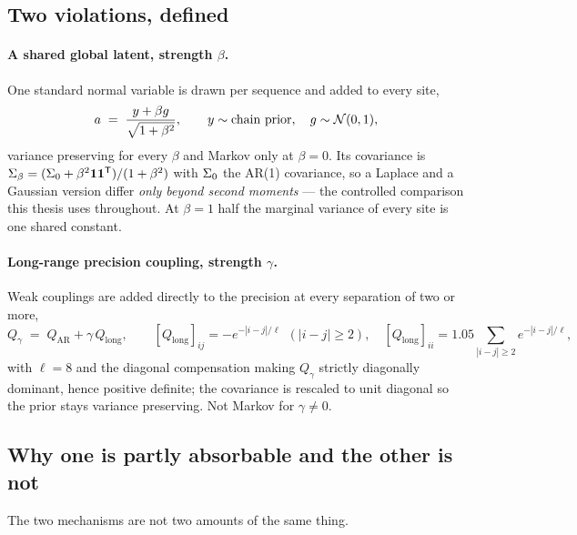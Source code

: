\subsection{Two violations, defined}

\paragraph{A shared global latent, strength $\beta$.} One standard normal
variable is drawn per sequence and added to every site,
\begin{equation}
  a \;=\; \frac{y + \beta g}{\sqrt{1+\beta^2}},
  \qquad y \sim \text{chain prior},
  \quad g \sim \mathcal{N}(0,1),
  \label{eq:em-global}
\end{equation}
variance preserving for every $\beta$ and Markov only at $\beta = 0$. Its
covariance is
$\Sigma_\beta = (\Sigma_0 + \beta^2 \mathbf{1}\mathbf{1}^{\mathsf{T}})/(1+\beta^2)$ with
$\Sigma_0$ the AR(1) covariance, so a Laplace and a Gaussian version differ
\emph{only beyond second moments} --- the controlled comparison this thesis uses
throughout. At $\beta = 1$ half the marginal variance of every site is one
shared constant.

\paragraph{Long-range precision coupling, strength $\gamma$.} Weak couplings are
added directly to the precision at every separation of two or more,
\begin{equation}
  Q_\gamma \;=\; Q_{\mathrm{AR}} + \gamma\,Q_{\mathrm{long}},
  \qquad
  [Q_{\mathrm{long}}]_{ij} = -e^{-|i-j|/\ell}\ \ (|i-j| \geq 2),
  \quad
  [Q_{\mathrm{long}}]_{ii} = 1.05 \sum_{|i-j| \geq 2} e^{-|i-j|/\ell},
  \label{eq:em-longrange}
\end{equation}
with $\ell = 8$ and the diagonal compensation making $Q_\gamma$ strictly
diagonally dominant, hence positive definite; the covariance is rescaled to unit
diagonal so the prior stays variance preserving. Not Markov for
$\gamma \neq 0$.

\subsection{Why one is partly absorbable and the other is not}

The two mechanisms are not two amounts of the same thing.

